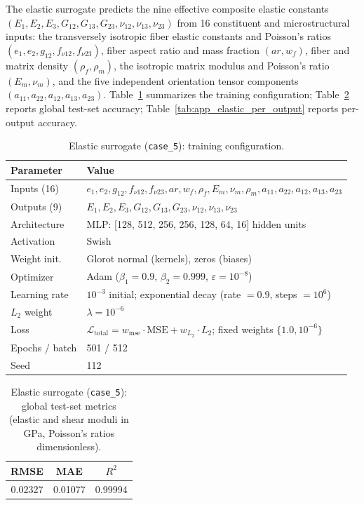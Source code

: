 \documentclass[preprint,review,10pt,number]{elsarticle}
\begin{document}
The elastic surrogate predicts the nine effective composite elastic
constants $(E_1, E_2, E_3, G_{12}, G_{13}, G_{23}, \nu_{12}, \nu_{13},
\nu_{23})$ from 16 constituent and microstructural inputs: the
transversely isotropic fiber elastic constants and Poisson's ratios
$(e_1, e_2, g_{12}, f_{\nu 12}, f_{\nu 23})$, fiber aspect ratio and
mass fraction $(ar, w_f)$, fiber and matrix density $(\rho_f, \rho_m)$,
the isotropic matrix modulus and Poisson's ratio $(E_m, \nu_m)$, and
the five independent orientation tensor components $(a_{11}, a_{22},
a_{12}, a_{13}, a_{23})$. Table~\ref{tab:app_elastic_config} summarizes
the training configuration; Table~\ref{tab:app_elastic_global} reports
global test-set accuracy; Table~\ref{tab:app_elastic_per_output}
reports per-output accuracy.

\begin{table}[h]
\centering
\caption{Elastic surrogate (\texttt{case\_5}): training configuration.}
\label{tab:app_elastic_config}
\begin{tabular}{ll}
\toprule
Parameter & Value \\
\midrule
Inputs (16)     & $e_1, e_2, g_{12}, f_{\nu 12}, f_{\nu 23}, ar, w_f, \rho_f, E_m, \nu_m, \rho_m, a_{11}, a_{22}, a_{12}, a_{13}, a_{23}$ \\
Outputs (9)     & $E_1, E_2, E_3, G_{12}, G_{13}, G_{23}, \nu_{12}, \nu_{13}, \nu_{23}$ \\
Architecture    & MLP: [128, 512, 256, 256, 128, 64, 16] hidden units \\
Activation      & Swish \\
Weight init.    & Glorot normal (kernels), zeros (biases) \\
Optimizer       & Adam ($\beta_1 = 0.9$, $\beta_2 = 0.999$, $\varepsilon = 10^{-8}$) \\
Learning rate   & $10^{-3}$ initial; exponential decay (rate $= 0.9$, steps $= 10^{6}$) \\
$L_2$ weight    & $\lambda = 10^{-6}$ \\
Loss            & $\mathcal{L}_{\text{total}} = w_{\text{mse}} \cdot \text{MSE} + w_{L_2} \cdot L_2$; fixed weights $\{1.0, 10^{-6}\}$ \\
Epochs / batch  & 501 / 512 \\
Seed            & 112 \\
\bottomrule
\end{tabular}
\end{table}

\begin{table}[h]
\centering
\caption{Elastic surrogate (\texttt{case\_5}): global test-set metrics
(elastic and shear moduli in GPa, Poisson's ratios dimensionless).}
\label{tab:app_elastic_global}
\begin{tabular}{ccc}
\toprule
RMSE & MAE & $R^2$ \\
\midrule
0.02327 & 0.01077 & 0.99994 \\
\bottomrule
\end{tabular}
\end{table}
\end{document}
